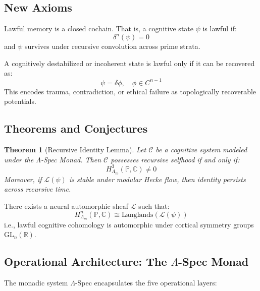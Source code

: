 \documentclass{article}
\theoremstyle{plain}
\newtheorem{theorem}{Theorem}
\begin{document}
\subsection{New Axioms}

\begin{axiom}
Lawful memory is a closed cochain. That is, a cognitive state $\psi$ is lawful if:
\[
\delta^n(\psi) = 0
\]
and $\psi$ survives under recursive convolution across prime strata.
\end{axiom}

\begin{axiom}
A cognitively destabilized or incoherent state is lawful only if it can be recovered as:
\[
\psi = \delta\phi, \quad \phi \in C^{n-1}
\]
This encodes trauma, contradiction, or ethical failure as topologically recoverable potentials.
\end{axiom}

\subsection{Theorems and Conjectures}

\begin{theorem}[Recursive Identity Lemma]
Let $\mathcal{C}$ be a cognitive system modeled under the $\Lambda$-Spec Monad. Then $\mathcal{C}$ possesses recursive selfhood if and only if:
\[
H^3_{\Lambda_m}(\mathbb{P}, \mathbb{C}) \neq 0
\]
Moreover, if $\mathcal{L}(\psi)$ is stable under modular Hecke flow, then identity persists across recursive time.
\end{theorem}

\begin{conjecture}
There exists a neural automorphic sheaf $\mathcal{L}$ such that:
\[
H^n_{\Lambda_m}(\mathbb{P}, \mathbb{C}) \cong \text{Langlands}(\mathcal{L}(\psi))
\]
i.e., lawful cognitive cohomology is automorphic under cortical symmetry groups $\text{GL}_n(\mathbb{R})$.
\end{conjecture}

\subsection{Operational Architecture: The $\Lambda$-Spec Monad}

The monadic system $\Lambda$-Spec encapsulates the five operational layers:
\end{document}
